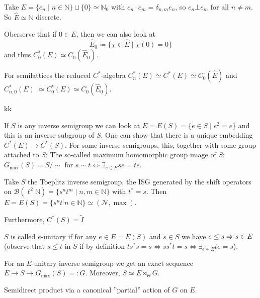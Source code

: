 \documentclass[a4paper]{article}
\begin{document}
\begin{exercise}
	Take $E = \{ e_n \mid n \in \mathds{N} \} \sqcup \{0\} \simeq \mathds{N}_0$ with $e_n \cdot e_m = \delta_{n,m} e_n$, so $e_n \bot e_m$ for all $n \neq m$. 
	So $\hat{E} \simeq \mathds{N}$ discrete.

	Oberserve that if $0 \in E$, then we can also look at
	\begin{equation*}
		\hat{E}_0 \coloneq \{ \chi \in \hat{E} \mid \chi(0) = 0 \} 
	\end{equation*}
	and thus $C_0^*(E) \simeq C_0(\hat{E}_0)$.
\end{exercise}

\begin{remark}
	For semilattices the reduced $C^*$-algebra $C^*_n(E) \simeq C^*(E) \simeq C_0(\hat{E})$ and $C^*_{n,0}(E)$ $\simeq C^*_0(E) \simeq C_0(\hat{E}_0)$.
\end{remark}kk

\begin{remark}
	If $S$ is any inverse semigroup we can look at $E = E(S) =\{e \in S \mid e^2 = e\}$ and this is an inverse subgroup of $S$.
	One can show that there is a unique embedding $C^*(E) \to C^*(S)$.
	For some inverse semigroups, this, together with some group attached to $S$:
	The so-called maximum homomorphic group image of $S$:
	$G_{\max}(S) = S/\sim$ for $s \sim t \iff \exists_{e \in E} se = te$.

\end{remark}

\begin{example}
	Take $S$ the Toeplitz inverse semigroup, the ISG generated by the shift operators on $\mathcal{B}(\ell^2 \mathds{N}) = \{s^n t^m \mid n,m \in \mathds{N}\}$ with $t^* = s$.
	Then $E = E(S) = \{s^n t^ \mid n \in \mathds{N} \} \simeq (\mathscr{N}, \max)$.

	Furthermore, $C^*(S) = \tilde{I}$	
\end{example}

\begin{remark}
	$S$ is called $e$-unitary if for any $e \in E = E(S)$ and $s \in S$ we have $e \leq s \Rightarrow s \in E$ (observe that $s \leq t$ in $S$ if by definition $t s^* s = s \iff ss^* t = s \iff \exists_{e \in E} te = s$).

	For an $E$-unitary inverse semigroup we get an exact sequence $E \to S \to G_{\max}(S) =: G$. Moreover, $S \simeq E \rtimes_{\Theta} G$.

	Semidirect product via a canonical ''partial'' action of $G$ on $E$.
\end{remark}
\end{document}
